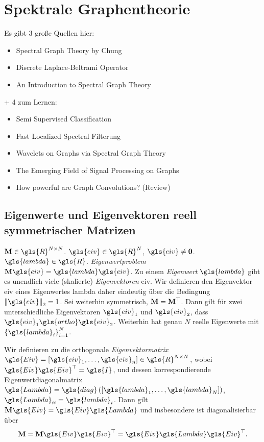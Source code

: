 \section{Spektrale Graphentheorie}
\label{spektrale_graphentheorie}

Es gibt 3 große Quellen hier:
\begin{itemize}
  \item Spectral Graph Theory by Chung
  \item Discrete Laplace-Beltrami Operator
  \item An Introduction to Spectral Graph Theory
\end{itemize}
+ 4 zum Lernen:
\begin{itemize}
  \item Semi Supervised Classification
  \item Fast Localized Spectral Filterung
  \item Wavelets on Graphs via Spectral Graph Theory
  \item The Emerging Field of Signal Processing on Graphs
  \item How powerful are Graph Convolutions? (Review)
\end{itemize}

\subsection{Eigenwerte und Eigenvektoren reell symmetrischer Matrizen}
\label{eigenwerte_symmetrischer_matrizen}


$\ma{M} \in \gls{R}^{N \times N}$.
$\gls{eiv} \in \gls{R}^{N}$, $\gls{eiv} \neq \mathbf{0}$.
$\gls{lambda} \in \gls{R}$.
\emph{Eigenwertproblem} $\ma{M}\gls{eiv} = \gls{lambda}\gls{eiv}$.
Zu einem \emph{Eigenwert} $\gls{lambda}$ gibt es unendlich viele (skalierte) \emph{Eigenvektoren} \gls{eiv}.
Wir definieren den Eigenvektor \gls{eiv} eines Eigenwertes \gls{lambda} daher eindeutig über die Bedingung $\left\|\gls{eiv}\right\|_2 = 1$.
Sei  weiterhin symmetrisch, \dhe{} $\mathbf{M} = \mathbf{M}^{\top}$.
Dann gilt für zwei unterschiedliche Eigenvektoren $\gls{eiv}_1$ und $\gls{eiv}_2$, dass $\gls{eiv}_1 \gls{ortho} \gls{eiv}_2$.
Weiterhin hat  genau $N$ reelle Eigenwerte mit ${\left\{\gls{lambda}_i\right\}}_{i=1}^N$.

Wir definieren zu  die orthogonale \emph{Eigenvektormatrix} $\gls{Eiv} = \left[\gls{eiv}_1, \ldots, \gls{eiv}_n\right] \in \gls{R}^{N \times N}$, wobei $\gls{Eiv}\gls{Eiv}^{\top}=\gls{I}$, und dessen korrespondierende Eigenwertdiagonalmatrix $\gls{Lambda} = \gls{diag}\left(\left[\gls{lambda}_1, \ldots, \gls{lambda}_N\right]\right)$, \dhe{} $\gls{Lambda}_{ii} = \gls{lambda}_i$.
Dann gilt $\ma{M}\gls{Eiv} = \gls{Eiv}\gls{Lambda}$ und insbesondere ist  diagonalisierbar über
\begin{equation}
  \ma{M} = \ma{M}\gls{Eiv}\gls{Eiv}^{\top} = \gls{Eiv}\gls{Lambda}\gls{Eiv}^{\top}.
\end{equation}

